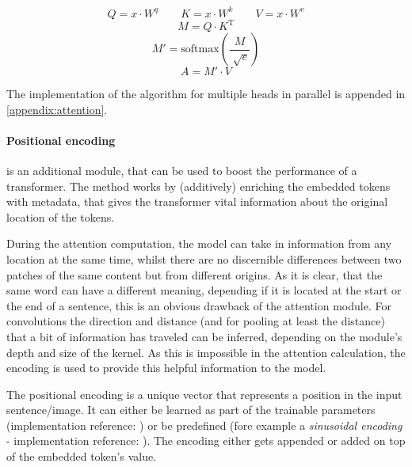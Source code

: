 \begin{equation}
    \label{eq:attention-step-1}
    Q = x \cdot W^q \qquad K = x \cdot W^k \qquad V = x \cdot W^v
\end{equation}
\begin{equation}
    \label{eq:attention-step-2}
    M = Q\cdot K^\mathrm{T}
\end{equation}
\begin{equation}
    \label{eq:attention-step-3-4}
    M' = \mathrm{softmax}\left(\frac{M}{\sqrt[]{e}}\right)
\end{equation}
\begin{equation}
    \label{eq:attention-step-5}
    A = M' \cdot V
\end{equation}

The implementation of the algorithm for multiple heads in parallel is appended in \autoref{appendix:attention}.

\FloatBarrier
\paragraph{Positional encoding} is an additional module, that can be used to boost the performance of a transformer.
The method works by (additively) enriching the embedded tokens with \glqq metadata\grqq{}, that gives the transformer vital information about the original location of the tokens.

During the attention computation, the model can take in information from any location at the same time, whilst there are no discernible differences between two patches of the same content but from different origins.
As it is clear, that the same word can have a different meaning, depending if it is located at the start or the end of a sentence, this is an obvious drawback of the attention module. 
For convolutions the direction and distance (and for pooling at least the distance) that a bit of information has traveled can be inferred, depending on the module's depth and size of the kernel. 
As this is impossible in the attention calculation, the encoding is used to provide this helpful information to the model.

The positional encoding is a unique vector that represents a position in the input sentence/image.
It can either be learned as part of the trainable parameters (implementation reference: \cite{dinoGithub}) or be predefined (fore example a \emph{sinusoidal encoding} - implementation reference: \cite{positionalEncodingGithub}).
The encoding either gets appended or added on top of the embedded token's value.

